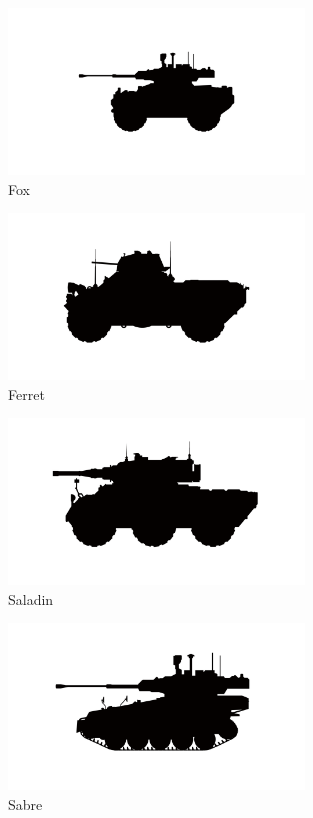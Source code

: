 \begin{figure}[h]
  \centering
  \includegraphics[width=0.7\textwidth]{platforms/fox.pdf}
  \caption*{Fox}
\end{figure}

\begin{figure}[h]
  \centering
  \includegraphics[width=0.7\textwidth]{platforms/ferret.pdf}
  \caption*{Ferret}
\end{figure}

\begin{figure}[h]
  \centering
  \includegraphics[width=0.7\textwidth]{platforms/saladin.pdf}
  \caption*{Saladin}
\end{figure}

\begin{figure}[h]
  \centering
  \includegraphics[width=0.7\textwidth]{platforms/sabre.pdf}
  \caption*{Sabre}
\end{figure}

